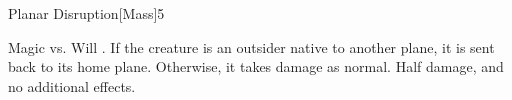 \begin{spellsection}{Planar Disruption}[Mass]{5}
\begin{spellheader}
\end{spellheader}
\begin{spellcontent}
    \begin{spelltargetinginfo}
    \end{spelltargetinginfo}
    \begin{spelleffects}
        \begin{spellattack}{Magic vs. Will}
            \spellsuccess {}.
            \spellcritical If the creature is an outsider native to another plane, it is sent back to its home plane. Otherwise, it takes damage as normal.
            \spellfailure Half damage, and no additional effects.
        \end{spellattack}
    \end{spelleffects}
\end{spellcontent}
\begin{spellfooter}
\end{spellfooter}
\end{spellsection}


